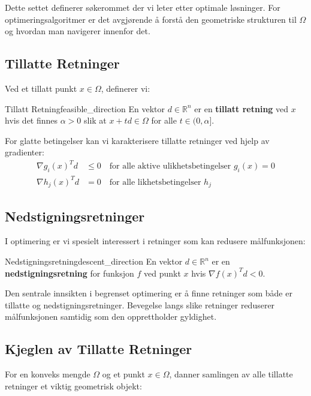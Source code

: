 Dette settet definerer søkerommet der vi leter etter optimale løsninger. For optimeringsalgoritmer er det avgjørende å forstå den geometriske strukturen til \(\Omega\) og hvordan man navigerer innenfor det.

\subsection{Tillatte Retninger}
Ved et tillatt punkt \(x \in \Omega\), definerer vi:

\begin{definition}{Tillatt Retning}{feasible_direction}
	En vektor \(d \in \mathbb{R}^n\) er en \textbf{tillatt retning} ved \(x\) hvis det finnes \(\alpha > 0\) slik at \(x + td \in \Omega\) for alle \(t \in (0, \alpha]\).
\end{definition}

For glatte betingelser kan vi karakterisere tillatte retninger ved hjelp av gradienter:
\begin{align}
	\nabla g_i(x)^T d & \leq 0 \quad \text{for alle aktive ulikhetsbetingelser } g_i(x) = 0 \\
	\nabla h_j(x)^T d & = 0 \quad \text{for alle likhetsbetingelser } h_j
\end{align}

\subsection{Nedstigningsretninger}
I optimering er vi spesielt interessert i retninger som kan redusere målfunksjonen:

\begin{definition}{Nedstigningsretning}{descent_direction}
	En vektor \(d \in \mathbb{R}^n\) er en \textbf{nedstigningsretning} for funksjon \(f\) ved punkt \(x\) hvis \(\nabla f(x)^T d < 0\).
\end{definition}

Den sentrale innsikten i begrenset optimering er å finne retninger som både er tillatte og nedstigningsretninger. Bevegelse langs slike retninger reduserer målfunksjonen samtidig som den opprettholder gyldighet.

\subsection{Kjeglen av Tillatte Retninger}
For en konveks mengde \(\Omega\) og et punkt \(x \in \Omega\), danner samlingen av alle tillatte retninger et viktig geometrisk objekt:

